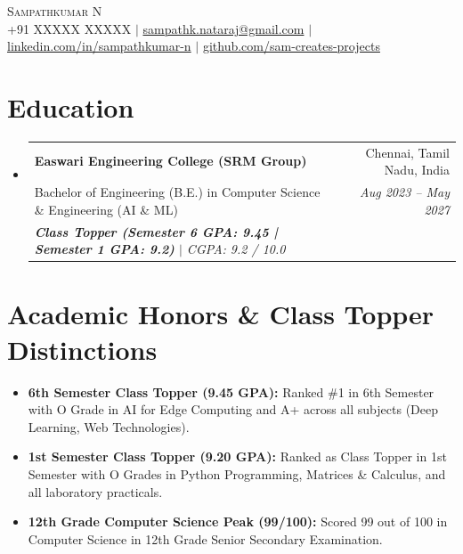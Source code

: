 \documentclass[letterpaper,11pt]{article}
\begin{document}
\begin{center}
    {\Huge \scshape Sampathkumar N} \\ \vspace{2pt}
    \small +91 XXXXX XXXXX $|$ \href{mailto:sampathk.nataraj@gmail.com}{sampathk.nataraj@gmail.com} $|$ 
    \href{https://www.linkedin.com/in/sampathkumar-n}{linkedin.com/in/sampathkumar-n} $|$
    \href{https://github.com/sam-creates-projects}{github.com/sam-creates-projects}
\end{center}

\section{Education}
  \begin{itemize}[leftmargin=0.15in, label={}]
    \item
      \begin{tabularx}{\linewidth}{X r}
        \textbf{Easwari Engineering College (SRM Group)} & Chennai, Tamil Nadu, India \\
        Bachelor of Engineering (B.E.) in Computer Science \& Engineering (AI \& ML) & \textit{Aug 2023 -- May 2027} \\
        \textit{\textbf{Class Topper (Semester 6 GPA: 9.45 | Semester 1 GPA: 9.2)} $|$ CGPA: 9.2 / 10.0} & \\
      \end{tabularx}
  \end{itemize}

\section{Academic Honors \& Class Topper Distinctions}
  \begin{itemize}[leftmargin=0.15in]
    \item \textbf{6th Semester Class Topper (9.45 GPA):} Ranked \#1 in 6th Semester with O Grade in AI for Edge Computing and A+ across all subjects (Deep Learning, Web Technologies).
    \item \textbf{1st Semester Class Topper (9.20 GPA):} Ranked as Class Topper in 1st Semester with O Grades in Python Programming, Matrices \& Calculus, and all laboratory practicals.
    \item \textbf{12th Grade Computer Science Peak (99/100):} Scored 99 out of 100 in Computer Science in 12th Grade Senior Secondary Examination.
  \end{itemize}
\end{document}
